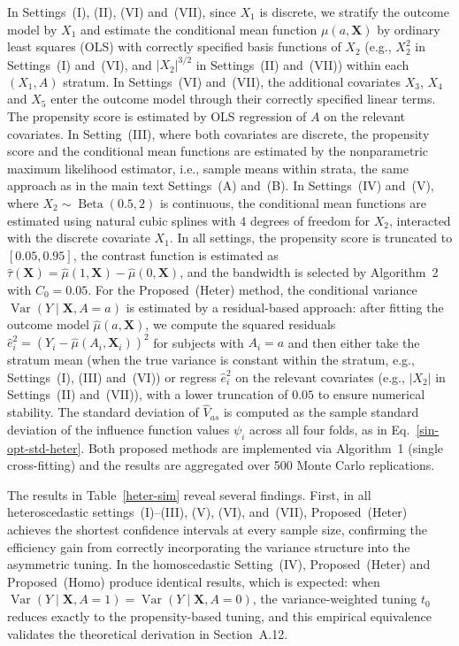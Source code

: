 \documentclass[11pt]{article}
\theoremstyle{referenceplain}
\theoremstyle{referencedefinition}
\theoremstyle{referenceremark}
\begin{document}
In Settings~(I), (II), (VI) and~(VII), since $X_1$ is discrete, we stratify the outcome model by $X_1$ and estimate the conditional mean function $\mu(a, \mathbf{X})$ by ordinary least squares (OLS) with correctly specified basis functions of $X_2$ (e.g., $X_2^2$ in Settings~(I) and~(VI), and $|X_2|^{3/2}$ in Settings~(II) and~(VII)) within each $(X_1, A)$ stratum. In Settings~(VI) and~(VII), the additional covariates $X_3$, $X_4$ and $X_5$ enter the outcome model through their correctly specified linear terms. The propensity score is estimated by OLS regression of $A$ on the relevant covariates. In Setting~(III), where both covariates are discrete, the propensity score and the conditional mean functions are estimated by the nonparametric maximum likelihood estimator, i.e., sample means within strata, the same approach as in the main text Settings~(A) and~(B). In Settings~(IV) and~(V), where $X_2\sim\operatorname{Beta}(0.5,2)$ is continuous, the conditional mean functions are estimated using natural cubic splines with 4 degrees of freedom for $X_2$, interacted with the discrete covariate $X_1$. In all settings, the propensity score is truncated to $[0.05,0.95]$, the contrast function is estimated as $\widehat{\tau}(\mathbf{X})=\widehat{\mu}(1,\mathbf{X})-\widehat{\mu}(0,\mathbf{X})$, and the bandwidth is selected by Algorithm~2 with ${C_0}=0.05$. For the Proposed~(Heter) method, the conditional variance $\operatorname{Var}(Y\mid\mathbf{X},A=a)$ is estimated by a residual-based approach: after fitting the outcome model $\widehat{\mu}(a,\mathbf{X})$, we compute the squared residuals $\widehat{e}_i^2 = (Y_i - \widehat{\mu}(A_i,\mathbf{X}_i))^2$ for subjects with $A_i=a$ and then either take the stratum mean (when the true variance is constant within the stratum, e.g., Settings~(I), (III) and~(VI)) or regress $\widehat{e}_i^2$ on the relevant covariates (e.g., $|X_2|$ in Settings~(II) and~(VII)), with a lower truncation of $0.05$ to ensure numerical stability. The standard deviation of $\widehat{V}_{as}$ is computed as the sample standard deviation of the influence function values $\psi_i$ across all four folds, as in Eq.~\eqref{sin-opt-std-heter}. Both proposed methods are implemented via Algorithm~1 (single cross-fitting) and the results are aggregated over 500 Monte Carlo replications.

The results in Table~\ref{heter-sim} reveal several findings. First, in
all heteroscedastic settings~(I)--(III), (V), (VI), and~(VII), Proposed~(Heter) achieves
the shortest confidence intervals at every sample size, confirming the
efficiency gain from correctly incorporating the variance structure into
the asymmetric tuning. In the homoscedastic Setting~(IV),
Proposed~(Heter) and Proposed~(Homo) produce identical results, which is
expected: when
$\operatorname{Var}(Y \mid \mathbf{X}, A=1) =
\operatorname{Var}(Y \mid \mathbf{X}, A=0)$, the variance-weighted tuning
$t_0$ reduces exactly to the propensity-based tuning, and this empirical
equivalence validates the theoretical derivation in Section~A.12.
\end{document}
